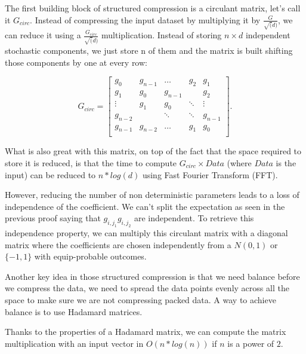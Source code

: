 \documentclass[11pt,a4paper]{article}
\begin{document}
	The first building block of structured compression is a circulant matrix, let's call it $G_{circ}$. Instead of compressing the input dataset by multiplying it by $\frac{G}{\sqrt(d)}$, we can reduce it using a $\frac{G_{circ}}{\sqrt(d)}$ multiplication. Instead of storing $n \times d$ independent stochastic components, we just store n of them and the matrix is built shifting those components by one at every row: 
	
	\begin{equation*}
        G_{circ}=
        \begin{bmatrix}
        g_0     & g_{n-1} & \dots  & g_{2} & g_{1}  \\
        g_{1} & g_0    & g_{n-1} &         & g_{2}  \\
        \vdots  & g_{1}& g_0    & \ddots  & \vdots   \\
        g_{n-2}  &        & \ddots & \ddots  & g_{n-1}   \\
        g_{n-1}  & g_{n-2} & \dots  & g_{1} & g_0 \\
        \end{bmatrix}.
	\end{equation*}

	
	
	What is also great with this matrix, on top of the fact that the space required to store it is reduced, is that the time to compute $G_{circ} \times Data$ (where $Data$ is the input) can be reduced to $n*log(d)$ using Fast Fourier Transform (FFT).
	 
	 
	However, reducing the number of non deterministic parameters leads to a loss of independence of the coefficient. We can't split the expectation as seen in the previous proof saying that $g_{i,j_1} g_{i,j_2}$ are independent. To retrieve this independence property, we can multiply this circulant matrix with a diagonal matrix where the coefficients are chosen independently from a $N(0,1)$ or $\{-1,1\}$ with equip-probable outcomes.
	
	Another key idea in those structured compression is that we need balance before we compress the data, we need to spread the data points evenly across all the space to make sure we are not compressing packed data. A way to achieve balance is to use Hadamard matrices.
	
	
	
	
	Thanks to the properties of a Hadamard matrix, we can compute the matrix multiplication with an input vector in $O(n*log(n))$ if $n$ is a power of $2$.
	
\end{document}
